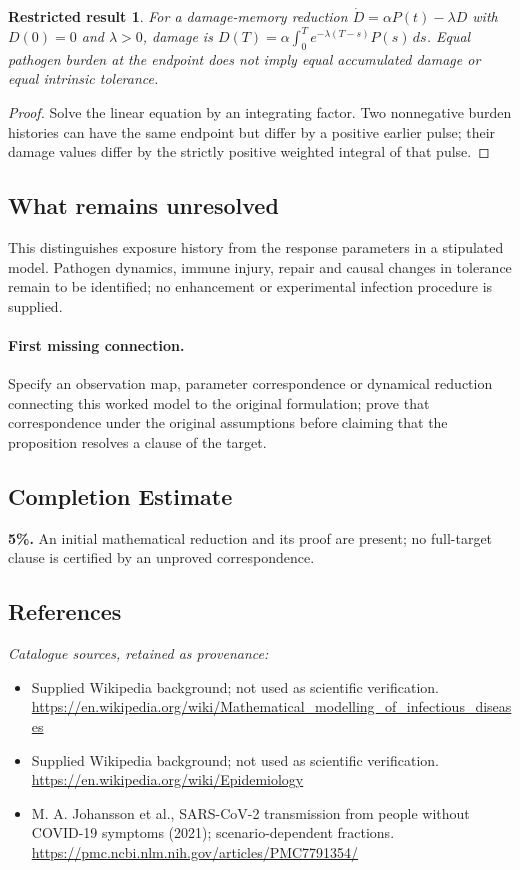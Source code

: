\documentclass[11pt]{article}
\newtheorem{attemptresult}{Restricted result}[section]
\begin{document}
\begin{attemptresult}
For a damage-memory reduction $\dot D=\alpha P(t)-\lambda D$ with $D(0)=0$ and $\lambda>0$, damage is $D(T)=\alpha\int_0^T e^{-\lambda(T-s)}P(s)\,ds$. Equal pathogen burden at the endpoint does not imply equal accumulated damage or equal intrinsic tolerance.
\end{attemptresult}
\begin{proof}
Solve the linear equation by an integrating factor. Two nonnegative burden histories can have the same endpoint but differ by a positive earlier pulse; their damage values differ by the strictly positive weighted integral of that pulse.
\end{proof}
\subsection{What remains unresolved}
This distinguishes exposure history from the response parameters in a stipulated model. Pathogen dynamics, immune injury, repair and causal changes in tolerance remain to be identified; no enhancement or experimental infection procedure is supplied.
\paragraph{First missing connection.} Specify an observation map, parameter correspondence or dynamical reduction connecting this worked model to the original formulation; prove that correspondence under the original assumptions before claiming that the proposition resolves a clause of the target.
\subsection{Completion Estimate}
\textbf{5\%.} An initial mathematical reduction and its proof are present; no full-target clause is certified by an unproved correspondence.
\subsection{References}
\noindent\emph{Catalogue sources, retained as provenance:}
\begin{itemize}
\item Supplied Wikipedia background; not used as scientific verification. \url{https://en.wikipedia.org/wiki/Mathematical_modelling_of_infectious_diseases}
\item Supplied Wikipedia background; not used as scientific verification. \url{https://en.wikipedia.org/wiki/Epidemiology}
\item M. A. Johansson et al., SARS-CoV-2 transmission from people without COVID-19 symptoms (2021); scenario-dependent fractions. \url{https://pmc.ncbi.nlm.nih.gov/articles/PMC7791354/}
\end{itemize}
\clearpage
\end{document}
